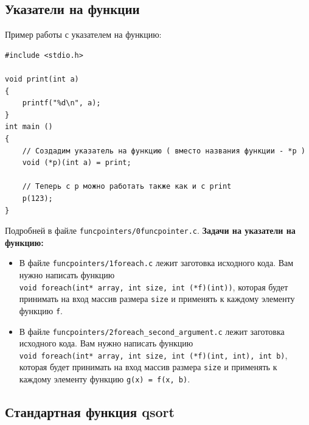 \documentclass{article}
\begin{document}
\subsection*{Указатели на функции}
Пример работы с указателем на функцию:
\begin{lstlisting}
#include <stdio.h>

void print(int a)
{
    printf("%d\n", a);
}
int main ()
{
    // Создадим указатель на функцию ( вместо названия функции - *p )
    void (*p)(int a) = print;
    
    // Теперь с p можно работать также как и с print
    p(123);
}
\end{lstlisting}
Подробней в файле \texttt{funcpointers/0funcpointer.c}.
\textbf{Задачи на указатели на функцию:}
\begin{itemize}
\item В файле \texttt{funcpointers/1foreach.c} лежит заготовка исходного кода. Вам нужно написать функцию\\ \texttt{void foreach(int* array, int size, int (*f)(int))}, которая будет принимать на вход массив размера \texttt{size} и применять к каждому элементу функцию \texttt{f}.

\item В файле \texttt{funcpointers/2foreach\_second\_argument.c} лежит заготовка исходного кода. Вам нужно написать функцию\\ \texttt{void foreach(int* array, int size, int (*f)(int, int), int b)}, которая будет принимать на вход массив размера \texttt{size} и применять к каждому элементу функцию \texttt{g(x) = f(x, b)}.
\end{itemize}


\subsection*{Стандартная функция qsort}
\end{document}

